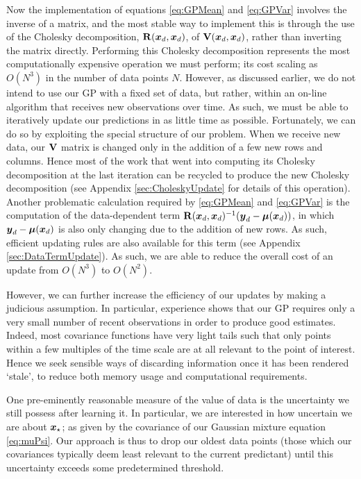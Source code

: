 \documentclass{acmtrans2m}
\begin{document}
\noindent Now the implementation of equations \eqref{eq:GPMean} and \eqref{eq:GPVar} involves the inverse of a matrix, and the most stable way to implement this is through the use of the Cholesky decomposition, $\mathbf{R}(\boldsymbol{x}_d,\boldsymbol{x}_d)$, of $\mathbf{V}(\boldsymbol{x}_d,\boldsymbol{x}_d)$, rather than inverting the matrix directly. %
Performing this Cholesky decomposition represents the most computationally expensive operation we must perform; its cost scaling as $O(N^3)$ in the number of data points $N$. However, as discussed earlier, we do not intend to use our GP with a fixed set of data, but rather, within an on-line algorithm that receives new observations over time. As such, we must be able to iteratively update our predictions in as little time as possible. Fortunately, we can do so by exploiting the special structure of our problem. When we receive new data, our $\mathbf{V}$ matrix is changed only in the addition of a few new rows and columns. Hence most of the work that went into computing its Cholesky decomposition at the last iteration can be recycled to produce the new Cholesky decomposition (see Appendix \ref{sec:CholeskyUpdate} for details of this operation). Another problematic calculation required by \eqref{eq:GPMean} and \eqref{eq:GPVar} is the computation of the data-dependent term $\mathbf{R}(\boldsymbol{x}_d,\boldsymbol{x}_d)^{-1}(\boldsymbol{y}_d-\boldsymbol{\mu}(\boldsymbol{x}_d))$, in which $\boldsymbol{y}_d-\boldsymbol{\mu}(\boldsymbol{x}_d)$ is also only changing due to the addition of new rows. As such, efficient updating rules are also available for this term (see Appendix \ref{sec:DataTermUpdate}). As such, we are able to reduce the overall cost of an update from $O(N^3)$ to $O(N^2)$.

However, we can further increase the efficiency of our updates by making a judicious assumption. In particular, experience shows that our GP requires only a very small number of recent observations in order to produce good estimates. Indeed, most covariance functions have very light tails such that only points within a few multiples of the time scale are at all relevant to the point of interest. Hence we seek sensible ways of discarding information once it has been rendered `stale', to reduce both memory usage and computational requirements.

One pre-eminently reasonable measure of the value of data is the uncertainty we still possess after learning it. In particular, we are interested in how uncertain we are about $\boldsymbol{x}_\star$; as given by the covariance of our Gaussian mixture equation \eqref{eq:muPsi}. Our approach is thus to drop our oldest data points (those which our covariances typically deem least relevant to the current predictant) until this uncertainty exceeds some predetermined threshold. 
\end{document}
